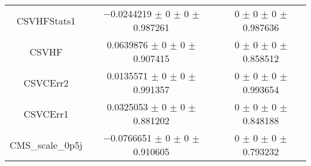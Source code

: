 \begin{table}
\begin{tabular}{ccc}
CSVHFStats1 	& \num{-0.0244219} $\pm$ \num{0} $\pm$ \num{0} $\pm$ \num{0.987261} 	& \num{0} $\pm$ \num{0} $\pm$ \num{0} $\pm$ \num{0.987636}\\
CSVHF 	& \num{0.0639876} $\pm$ \num{0} $\pm$ \num{0} $\pm$ \num{0.907415} 	& \num{0} $\pm$ \num{0} $\pm$ \num{0} $\pm$ \num{0.858512}\\
CSVCErr2 	& \num{0.0135571} $\pm$ \num{0} $\pm$ \num{0} $\pm$ \num{0.991357} 	& \num{0} $\pm$ \num{0} $\pm$ \num{0} $\pm$ \num{0.993654}\\
CSVCErr1 	& \num{0.0325053} $\pm$ \num{0} $\pm$ \num{0} $\pm$ \num{0.881202} 	& \num{0} $\pm$ \num{0} $\pm$ \num{0} $\pm$ \num{0.848188}\\
CMS\_scale\_0p5j 	& \num{-0.0766651} $\pm$ \num{0} $\pm$ \num{0} $\pm$ \num{0.910605} 	& \num{0} $\pm$ \num{0} $\pm$ \num{0} $\pm$ \num{0.793232}\\
\bottomrule
\end{tabular}
\end{table}